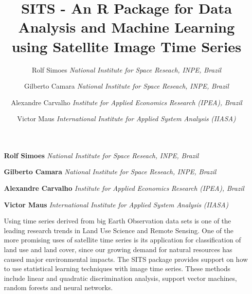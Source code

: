 \documentclass[11pt,]{article}
\title{SITS - An R Package for Data Analysis and Machine Learning using
Satellite Image Time Series  }
\author{\Large Rolf Simoes\vspace{0.05in} \newline\normalsize\emph{National Institute for Space Reseach, INPE, Brazil}   \and \Large Gilberto Camara\vspace{0.05in} \newline\normalsize\emph{National Institute for Space Reseach, INPE, Brazil}   \and \Large Alexandre Carvalho\vspace{0.05in} \newline\normalsize\emph{Institute for Applied Economics Research (IPEA), Brazil}   \and \Large Victor Maus\vspace{0.05in} \newline\normalsize\emph{International Institute for Applied System Analysis (IIASA)}  }
\date{}
\newcommand*{\authorfont}{\fontfamily{phv}\selectfont}
\renewenvironment{abstract}
 {{%
    \setlength{\leftmargin}{0mm}
    \setlength{\rightmargin}{\leftmargin}%
  }%
  \relax}
 {\endlist}
\begin{document}
%

{%
\setlength{\parindent}{0pt}
\thispagestyle{plain}
{\fontsize{18}{20}\selectfont\raggedright
\maketitle  %

}

{
   \vskip 13.5pt\relax \normalsize\fontsize{11}{12}
\textbf{\authorfont Rolf Simoes} \hskip 15pt \emph{\small National Institute for Space Reseach, INPE, Brazil}   \par \textbf{\authorfont Gilberto Camara} \hskip 15pt \emph{\small National Institute for Space Reseach, INPE, Brazil}   \par \textbf{\authorfont Alexandre Carvalho} \hskip 15pt \emph{\small Institute for Applied Economics Research (IPEA), Brazil}   \par \textbf{\authorfont Victor Maus} \hskip 15pt \emph{\small International Institute for Applied System Analysis (IIASA)}   

}

}








\begin{abstract}

    \hbox{\vrule height .2pt width 39.14pc}

    \vskip 8.5pt %

\noindent Using time series derived from big Earth Observation data sets is one of
the leading research trends in Land Use Science and Remote Sensing. One
of the more promising uses of satellite time series is its application
for classification of land use and land cover, since our growing demand
for natural resources has caused major environmental impacts. The SITS
package provides support on how to use statistical learning techniques
with image time series. These methods include linear and quadratic
discrimination analysis, support vector machines, random forests and
neural networks.


    \hbox{\vrule height .2pt width 39.14pc}


\end{abstract}
\end{document}
